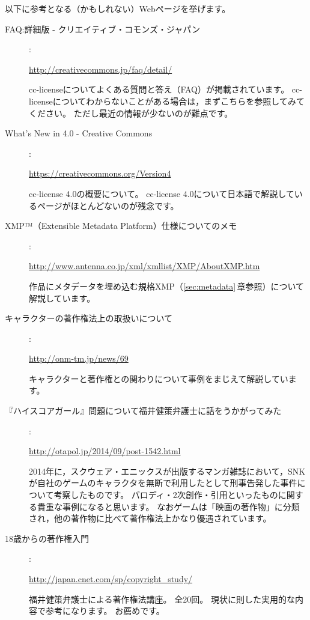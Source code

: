 \documentclass{ltjsarticle}
\begin{document}
以下に参考となる（かもしれない）Webページを挙げます。

\begin{description}

\item[FAQ:詳細版 - クリエイティブ・コモンズ・ジャパン] :\par
    \url{http://creativecommons.jp/faq/detail/}\par
    cc-licenseについてよくある質問と答え（FAQ）が掲載されています。
    cc-licenseについてわからないことがある場合は，まずこちらを参照してみてください。
    ただし最近の情報が少ないのが難点です。

\item[What's New in 4.0 - Creative Commons] :\par
    \url{https://creativecommons.org/Version4}\par
    cc-license 4.0の概要について。
    cc-license 4.0について日本語で解説しているページがほとんどないのが残念です。

\item[XMP™（Extensible Metadata Platform）仕様についてのメモ] :\par
    \url{http://www.antenna.co.jp/xml/xmllist/XMP/AboutXMP.htm}\par
    作品にメタデータを埋め込む規格XMP（\ref{sec:metadata}\,章参照）について解説しています。

\item[キャラクターの著作権法上の取扱いについて] :\par
    \url{http://onm-tm.jp/news/69}\par
    キャラクターと著作権との関わりについて事例をまじえて解説しています。

\item[『ハイスコアガール』問題について福井健策弁護士に話をうかがってみた] :\par
    \url{http://otapol.jp/2014/09/post-1542.html}\par
    2014年に，スクウェア・エニックスが出版するマンガ雑誌において，SNKが自社のゲームのキャラクタを無断で利用したとして刑事告発した事件について考察したものです。
    パロディ・2次創作・引用といったものに関する貴重な事例になると思います。
    なおゲームは「映画の著作物」に分類され，他の著作物に比べて著作権法上かなり優遇されています。

\item[18歳からの著作権入門] :\par
    \url{http://japan.cnet.com/sp/copyright_study/}\par
    福井健策弁護士による著作権法講座。
    全20回。
    現状に則した実用的な内容で参考になります。
    お薦めです。

\end{description}
\end{document}
